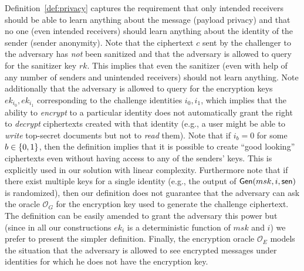 \documentclass{llncs}
\begin{document}
Definition~\ref{def:privacy} captures the requirement that only intended receivers should be able to learn anything about the message (payload privacy) and that no one (even intended receivers) should learn anything about the identity of the sender (sender anonymity). Note that the ciphertext $c$ sent by the challenger to the adversary has \emph{not} been sanitized and that the adversary is allowed to query for the sanitizer key $rk$. This implies that even the sanitizer (even with help of any number of senders and unintended receivers) should not learn anything. Note additionally that the adversary is allowed to query for the encryption keys $ek_{i_0},ek_{i_1}$ corresponding to the challenge identities $i_0,i_1$, which implies that the ability to \emph{encrypt} to a particular identity does not automatically grant the right to \emph{decrypt} ciphertexts created with that identity (e.g., a user might be able to \emph{write} top-secret documents but not to \emph{read} them). Note that if $i_b=0$ for some $b\in\{0,1\}$, then the definition implies that it is possible to create ``good looking'' ciphertexts even without having access to any of the senders' keys. This is  explicitly used in our solution with linear complexity. 
Furthermore note that if there exist multiple keys for a single identity (e.g., the output of $\mathsf{Gen}(msk,i,\mathsf{sen})$ is randomized), then our definition does not guarantee that the adversary can ask the oracle $\mathcal{O}_G$ for the encryption key used to generate the challenge ciphertext. The definition can be easily amended to grant the adversary this power but (since in all our constructions $ek_i$ is a deterministic function of $msk$ and $i$) we prefer to present the simpler definition.
Finally, the encryption oracle $\mathcal{O}_E$ models the situation that the adversary is allowed to see encrypted messages under identities for which he does not have the encryption key.
\end{document}
